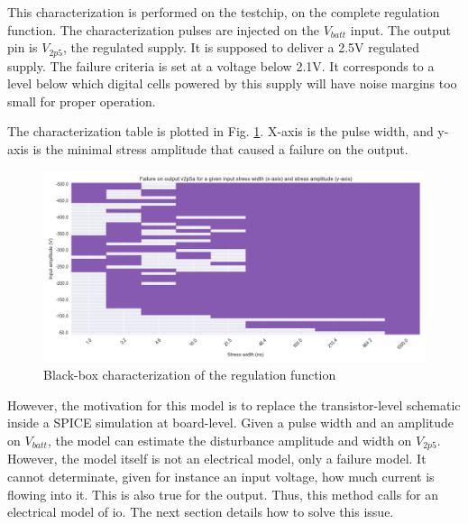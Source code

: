 This characterization is performed on the testchip, on the complete regulation function.
The characterization pulses are injected on the $V_{batt}$ input.
The output pin is $V_{2p5}$, the regulated supply.
It is supposed to deliver a 2.5V regulated supply.
The failure criteria is set at a voltage below 2.1V.
It corresponds to a level below which digital cells powered by this supply will have noise margins too small for proper operation.


The characterization table is plotted in Fig. \ref{fig:cz-black-box}.
X-axis is the pulse width, and y-axis is the minimal stress amplitude that caused a failure on the output.

\begin{figure}[!h]
  \centering
  \includegraphics[width=\textwidth]{src/4/figures/black_box_regulator.png}
  \caption{Black-box characterization of the regulation function}
  \label{fig:cz-black-box}
\end{figure}

However, the motivation for this model is to replace the transistor-level schematic inside a SPICE simulation at board-level.
Given a pulse width and an amplitude on $V_{batt}$, the model can estimate the disturbance amplitude and width on $V_{2p5}$.
However, the model itself is not an electrical model, only a failure model.
It cannot determinate, given for instance an input voltage, how much current is flowing into it.
This is also true for the output.
Thus, this method calls for an electrical model of \gls{io}.
The next section details how to solve this issue.

